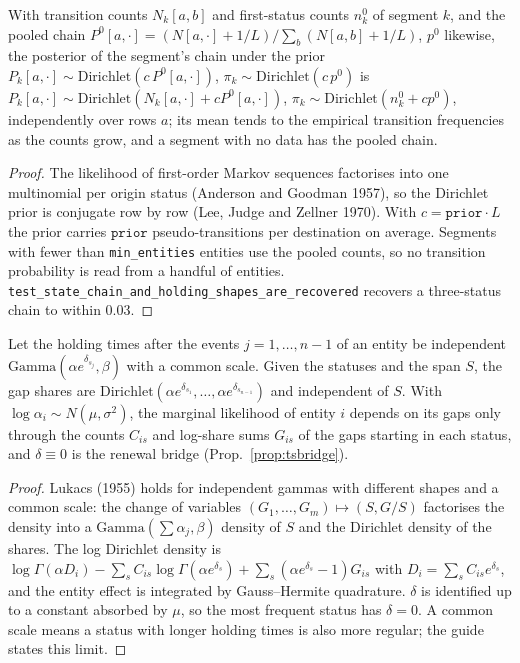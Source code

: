 \begin{proposition}\label{prop:simchain}
With transition counts $N_k[a,b]$ and first-status counts $n^0_k$ of segment $k$, and the pooled chain
$P^0[a,\cdot]=(N[a,\cdot]+1/L)/\sum_b(N[a,b]+1/L)$, $p^0$ likewise, the posterior of the segment's chain under the
prior $P_k[a,\cdot]\sim\mathrm{Dirichlet}(c\,P^0[a,\cdot])$, $\pi_k\sim\mathrm{Dirichlet}(c\,p^0)$ is
$P_k[a,\cdot]\sim\mathrm{Dirichlet}(N_k[a,\cdot]+cP^0[a,\cdot])$, $\pi_k\sim\mathrm{Dirichlet}(n^0_k+cp^0)$,
independently over rows $a$; its mean tends to the empirical transition frequencies as the counts grow, and a segment
with no data has the pooled chain.
\end{proposition}
\begin{proof}
The likelihood of first-order Markov sequences factorises into one multinomial per origin status
(Anderson and Goodman 1957), so the Dirichlet prior is conjugate row by row (Lee, Judge and Zellner 1970). With
$c=\texttt{prior}\cdot L$ the prior carries $\texttt{prior}$ pseudo-transitions per destination on average. Segments
with fewer than \texttt{min\_entities} entities use the pooled counts, so no transition probability is read from a
handful of entities. \texttt{test\_state\_chain\_and\_holding\_shapes\_are\_recovered} recovers a three-status chain
to within 0.03.
\end{proof}

\begin{proposition}\label{prop:simsemimarkov}
Let the holding times after the events $j=1,\dots,n-1$ of an entity be independent
$\mathrm{Gamma}(\alpha e^{\delta_{s_j}},\beta)$ with a common scale. Given the statuses and the span $S$, the gap
shares are $\mathrm{Dirichlet}(\alpha e^{\delta_{s_1}},\dots,\alpha e^{\delta_{s_{n-1}}})$ and independent of $S$.
With $\log\alpha_i\sim N(\mu,\sigma^2)$, the marginal likelihood of entity $i$ depends on its gaps only through the
counts $C_{is}$ and log-share sums $G_{is}$ of the gaps starting in each status, and $\delta\equiv0$ is the renewal
bridge (Prop.~\ref{prop:tsbridge}).
\end{proposition}
\begin{proof}
Lukacs (1955) holds for independent gammas with different shapes and a common scale: the change of variables
$(G_1,\dots,G_m)\mapsto(S,G/S)$ factorises the density into a $\mathrm{Gamma}(\sum\alpha_j,\beta)$ density of $S$ and
the Dirichlet density of the shares. The log Dirichlet density is
$\log\Gamma(\alpha D_i)-\sum_sC_{is}\log\Gamma(\alpha e^{\delta_s})+\sum_s(\alpha e^{\delta_s}-1)G_{is}$ with
$D_i=\sum_sC_{is}e^{\delta_s}$, and the entity effect is integrated by Gauss--Hermite quadrature. $\delta$ is
identified up to a constant absorbed by $\mu$, so the most frequent status has $\delta=0$. A common scale means a
status with longer holding times is also more regular; the guide states this limit.
\end{proof}

